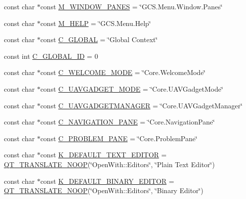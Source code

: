 \begin{DoxyCompactItemize}
const char $\ast$const \hyperlink{group___core_plugin_ga3715751eed82ee62217a73274763bba1}{\-M\-\_\-\-W\-I\-N\-D\-O\-W\-\_\-\-P\-A\-N\-E\-S} = \char`\"{}\-G\-C\-S.\-Menu.\-Window.\-Panes\char`\"{}
\item 
const char $\ast$const \hyperlink{group___core_plugin_ga67b5fbe80e9f8a05d1c50c1af7ac39d2}{\-M\-\_\-\-H\-E\-L\-P} = \char`\"{}\-G\-C\-S.\-Menu.\-Help\char`\"{}
\item 
const char $\ast$const \hyperlink{group___core_plugin_ga026249c67697bb54937e265ea9099145}{\-C\-\_\-\-G\-L\-O\-B\-A\-L} = \char`\"{}\-Global \-Context\char`\"{}
\item 
const int \hyperlink{group___core_plugin_ga73bcb9a176a2f5b7cec3008d5b0f244c}{\-C\-\_\-\-G\-L\-O\-B\-A\-L\-\_\-\-I\-D} = 0
\item 
const char $\ast$const \hyperlink{group___core_plugin_gad0a5b162b3b87854267c5508b62a9346}{\-C\-\_\-\-W\-E\-L\-C\-O\-M\-E\-\_\-\-M\-O\-D\-E} = \char`\"{}\-Core.\-Welcome\-Mode\char`\"{}
\item 
const char $\ast$const \hyperlink{group___core_plugin_gac70205e764db3d53257feb7830b1d676}{\-C\-\_\-\-U\-A\-V\-G\-A\-D\-G\-E\-T\-\_\-\-M\-O\-D\-E} = \char`\"{}\-Core.\-U\-A\-V\-Gadget\-Mode\char`\"{}
\item 
const char $\ast$const \hyperlink{group___core_plugin_gadcf6598aadc47f352b823e661b5d5a77}{\-C\-\_\-\-U\-A\-V\-G\-A\-D\-G\-E\-T\-M\-A\-N\-A\-G\-E\-R} = \char`\"{}\-Core.\-U\-A\-V\-Gadget\-Manager\char`\"{}
\item 
const char $\ast$const \hyperlink{group___core_plugin_ga8a566ff357ef08934d2179d440b638db}{\-C\-\_\-\-N\-A\-V\-I\-G\-A\-T\-I\-O\-N\-\_\-\-P\-A\-N\-E} = \char`\"{}\-Core.\-Navigation\-Pane\char`\"{}
\item 
const char $\ast$const \hyperlink{group___core_plugin_gaf36f8799cf16e7fafda4a60a92265bdb}{\-C\-\_\-\-P\-R\-O\-B\-L\-E\-M\-\_\-\-P\-A\-N\-E} = \char`\"{}\-Core.\-Problem\-Pane\char`\"{}
\item 
const char $\ast$const \hyperlink{group___core_plugin_ga8fd02192ee4d67c6cfef6f512aa9f080}{\-K\-\_\-\-D\-E\-F\-A\-U\-L\-T\-\_\-\-T\-E\-X\-T\-\_\-\-E\-D\-I\-T\-O\-R} = \hyperlink{pathchooser_8cpp_a16e29e1b1aa98988fcffee860cd361a3}{\-Q\-T\-\_\-\-T\-R\-A\-N\-S\-L\-A\-T\-E\-\_\-\-N\-O\-O\-P}(\char`\"{}\-Open\-With\-::\-Editors\char`\"{}, \char`\"{}\-Plain \-Text \-Editor\char`\"{})
\item 
const char $\ast$const \hyperlink{group___core_plugin_ga6ac6b0dc5b4d900f8854577cccc1e31c}{\-K\-\_\-\-D\-E\-F\-A\-U\-L\-T\-\_\-\-B\-I\-N\-A\-R\-Y\-\_\-\-E\-D\-I\-T\-O\-R} = \hyperlink{pathchooser_8cpp_a16e29e1b1aa98988fcffee860cd361a3}{\-Q\-T\-\_\-\-T\-R\-A\-N\-S\-L\-A\-T\-E\-\_\-\-N\-O\-O\-P}(\char`\"{}\-Open\-With\-::\-Editors\char`\"{}, \char`\"{}\-Binary \-Editor\char`\"{})

\end{DoxyCompactItemize}
